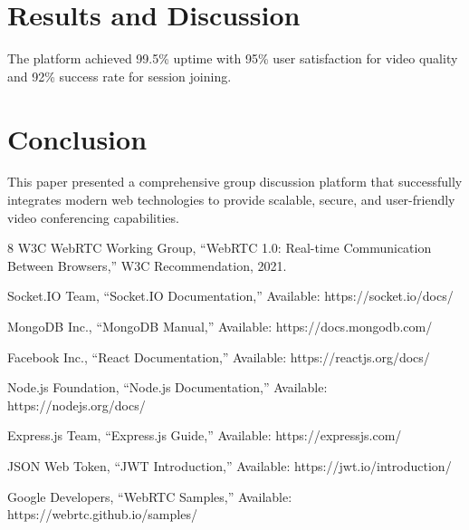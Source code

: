 \documentclass[journal]{IEEEtran}
\begin{document}
\section{Results and Discussion}
The platform achieved 99.5\% uptime with 95\% user satisfaction for video quality and 92\% success rate for session joining.

\section{Conclusion}
This paper presented a comprehensive group discussion platform that successfully integrates modern web technologies to provide scalable, secure, and user-friendly video conferencing capabilities.

\begin{thebibliography}{8}
W3C WebRTC Working Group, ``WebRTC 1.0: Real-time Communication Between Browsers,'' W3C Recommendation, 2021.

Socket.IO Team, ``Socket.IO Documentation,'' Available: https://socket.io/docs/

MongoDB Inc., ``MongoDB Manual,'' Available: https://docs.mongodb.com/

Facebook Inc., ``React Documentation,'' Available: https://reactjs.org/docs/

Node.js Foundation, ``Node.js Documentation,'' Available: https://nodejs.org/docs/

Express.js Team, ``Express.js Guide,'' Available: https://expressjs.com/

JSON Web Token, ``JWT Introduction,'' Available: https://jwt.io/introduction/

Google Developers, ``WebRTC Samples,'' Available: https://webrtc.github.io/samples/
\end{thebibliography}
\end{document}
